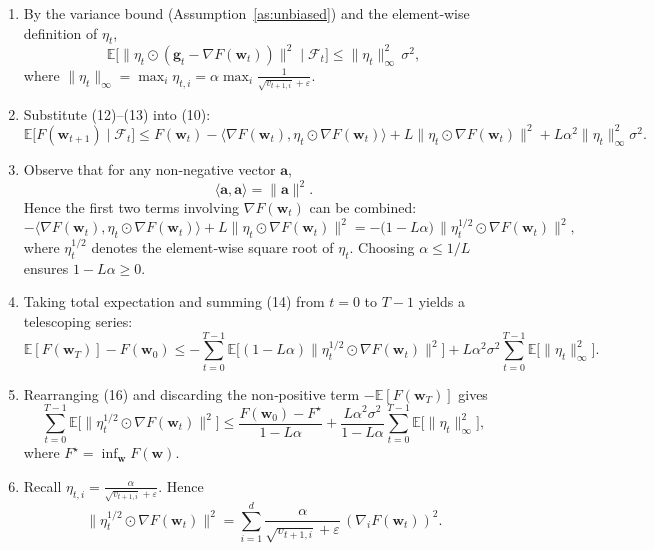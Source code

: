 \documentclass{article}
\newcommand{\E}{\mathbb{E}}
\begin{document}
\begin{enumerate}
\item[{\bf [Step 8]}] By the variance bound (Assumption~\ref{as:unbiased}) and the element‑wise definition of $\eta_{t}$,
\[
\E\!\big[\|\eta_{t}\odot(\mathbf g_{t}-\nabla F(\mathbf w_{t}))\|^{2}\mid\mathcal F_{t}\big]
\le \|\eta_{t}\|_{\infty}^{2}\,\sigma^{2},
\tag{13}
\]
where $\|\eta_{t}\|_{\infty}= \max_{i}\eta_{t,i}= \alpha\max_{i}\frac{1}{\sqrt{v_{t+1,i}}+\varepsilon}$.

\item[{\bf [Step 9]}] Substitute (12)–(13) into (10):
\[
\E\!\big[F(\mathbf w_{t+1})\mid\mathcal F_{t}\big]
\le F(\mathbf w_{t})
- \langle\nabla F(\mathbf w_{t}),\eta_{t}\odot\nabla F(\mathbf w_{t})\rangle
+L\|\eta_{t}\odot\nabla F(\mathbf w_{t})\|^{2}
+L\alpha^{2}\|\eta_{t}\|_{\infty}^{2}\sigma^{2}.
\tag{14}
\]

\item[{\bf [Step 10]}] Observe that for any non‑negative vector $\mathbf a$,
\[
\langle\mathbf a,\mathbf a\rangle = \|\mathbf a\|^{2}.
\]
Hence the first two terms involving $\nabla F(\mathbf w_{t})$ can be combined:
\[
- \langle\nabla F(\mathbf w_{t}),\eta_{t}\odot\nabla F(\mathbf w_{t})\rangle
+L\|\eta_{t}\odot\nabla F(\mathbf w_{t})\|^{2}
= -\big(1-L\alpha\big)\,\|\eta_{t}^{1/2}\odot\nabla F(\mathbf w_{t})\|^{2},
\tag{15}
\]
where $\eta_{t}^{1/2}$ denotes the element‑wise square root of $\eta_{t}$.
Choosing $\alpha\le 1/L$ ensures $1-L\alpha\ge 0$.

\item[{\bf [Step 11]}] Taking total expectation and summing (14) from $t=0$ to $T-1$ yields a telescoping series:
\[
\E[F(\mathbf w_{T})] - F(\mathbf w_{0})
\le -\sum_{t=0}^{T-1}\E\!\big[(1-L\alpha)\|\eta_{t}^{1/2}\odot\nabla F(\mathbf w_{t})\|^{2}\big]
+ L\alpha^{2}\sigma^{2}\sum_{t=0}^{T-1}\E\!\big[\|\eta_{t}\|_{\infty}^{2}\big].
\tag{16}
\]

\item[{\bf [Step 12]}] Rearranging (16) and discarding the non‑positive term $-\E[F(\mathbf w_{T})]$ gives
\[
\sum_{t=0}^{T-1}\E\!\big[\|\eta_{t}^{1/2}\odot\nabla F(\mathbf w_{t})\|^{2}\big]
\le
\frac{F(\mathbf w_{0})-F^{\star}}{1-L\alpha}
+ \frac{L\alpha^{2}\sigma^{2}}{1-L\alpha}\sum_{t=0}^{T-1}\E\!\big[\|\eta_{t}\|_{\infty}^{2}\big],
\tag{17}
\]
where $F^{\star}=\inf_{\mathbf w}F(\mathbf w)$.

\item[{\bf [Step 13]}] Recall $\eta_{t,i}= \frac{\alpha}{\sqrt{v_{t+1,i}}+\varepsilon}$. Hence
\[
\|\eta_{t}^{1/2}\odot\nabla F(\mathbf w_{t})\|^{2}
= \sum_{i=1}^{d}\frac{\alpha}{\sqrt{v_{t+1,i}}+\varepsilon}\,(\nabla_{i}F(\mathbf w_{t}))^{2}.
\tag{18}
\]


\end{enumerate}
\end{document}
